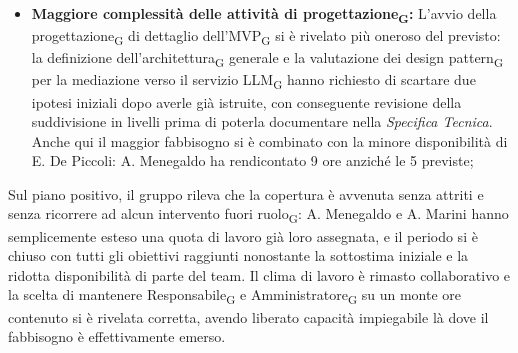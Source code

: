 ﻿\documentclass[a4paper, 10pt, colorlinks=true, linkcolor=black, urlcolor=blue, citecolor=blue, hidelinks]{article}
\begin{document}
\begin{itemize}
    \item \textbf{Maggiore complessità delle attività di progettazione\textsubscript{G}:} L'avvio della progettazione\textsubscript{G} di dettaglio dell'MVP\textsubscript{G} si è rivelato più oneroso del previsto: la definizione dell'architettura\textsubscript{G} generale e la valutazione dei design pattern\textsubscript{G} per la mediazione verso il servizio LLM\textsubscript{G} hanno richiesto di scartare due ipotesi iniziali dopo averle già istruite, con conseguente revisione della suddivisione in livelli prima di poterla documentare nella \textit{Specifica Tecnica}. Anche qui il maggior fabbisogno si è combinato con la minore disponibilità di E. De Piccoli: A. Menegaldo ha rendicontato 9 ore anziché le 5 previste;
\end{itemize}
Sul piano positivo, il gruppo rileva che la copertura è avvenuta senza attriti e senza ricorrere ad alcun intervento fuori ruolo\textsubscript{G}: A. Menegaldo e A. Marini hanno semplicemente esteso una quota di lavoro già loro assegnata, e il periodo si è chiuso con tutti gli obiettivi raggiunti nonostante la sottostima iniziale e la ridotta disponibilità di parte del team. Il clima di lavoro è rimasto collaborativo e la scelta di mantenere Responsabile\textsubscript{G} e Amministratore\textsubscript{G} su un monte ore contenuto si è rivelata corretta, avendo liberato capacità impiegabile là dove il fabbisogno è effettivamente emerso.
\end{document}
